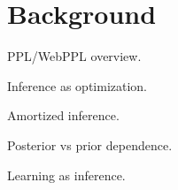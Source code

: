 \section{Background}
\label{sec:background}

PPL/WebPPL overview.

Inference as optimization.

Amortized inference.

Posterior vs prior dependence.

Learning as inference.